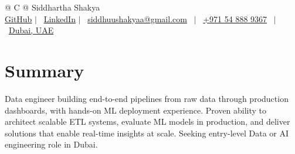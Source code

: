 \documentclass[a4paper,12pt]{article}
\begin{document}
\pagestyle{empty} 



\begin{tabularx}{\linewidth}{@{} C @{}}
\Huge{Siddhartha Shakya} \\[7.5pt]
\href{https://github.com/SiddhuShkya}{GitHub} $|$ \ 
\href{https://www.linkedin.com/in/sidShkya/}{LinkedIn} $|$ \
\href{mailto:siddhuushakyaa@gmail.com}{siddhuushakyaa@gmail.com} \ $|$ \ 
\href{tel:+971548889367}{+971 54 888 9367} \ $|$ \ 
\href{https://maps.google.com/?q=International+City,+Dubai}{Dubai, UAE} \\
\end{tabularx}


\section{Summary}
Data engineer building end-to-end pipelines from raw data through production dashboards, with hands-on ML deployment experience. Proven ability to architect scalable ETL systems, evaluate ML models in production, and deliver solutions that enable real-time insights at scale. Seeking entry-level Data or AI engineering role in Dubai.

\end{document}
